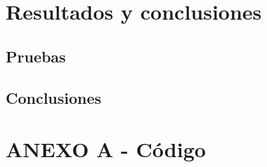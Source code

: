 \documentclass[a4paper, 12pt]{article}
\begin{document}
\section{Resultados y conclusiones}
\label{sec-5}

\subsection{Pruebas}
\label{sec-5-1}

\subsection{Conclusiones}
\label{sec-5-2}

\printbibliography[heading=bibnumbered] %

\section{ANEXO A - Código}
\label{sec-6}
\end{document}
